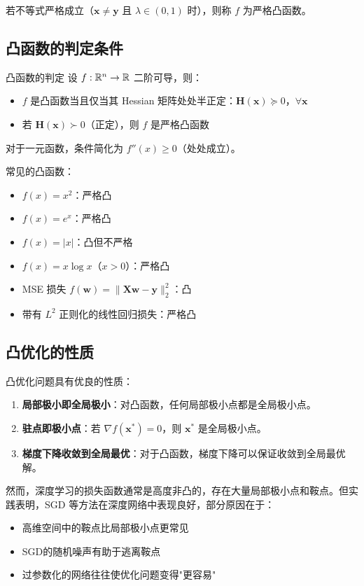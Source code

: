 若不等式严格成立（$\mathbf{x}\neq\mathbf{y}$ 且 $\lambda\in(0,1)$ 时），则称 $f$ 为严格凸函数。

\subsection{凸函数的判定条件}

\begin{myTheorem}{凸函数的判定}
设 $f:\mathbb{R}^n\to\mathbb{R}$ 二阶可导，则：
\begin{itemize}
    \item $f$ 是凸函数当且仅当其 Hessian 矩阵处处半正定：$\mathbf{H}(\mathbf{x})\succeq 0$，$\forall\mathbf{x}$
    \item 若 $\mathbf{H}(\mathbf{x})\succ 0$（正定），则 $f$ 是严格凸函数
\end{itemize}
\end{myTheorem}

对于一元函数，条件简化为 $f''(x)\geq 0$（处处成立）。

常见的凸函数：
\begin{itemize}
    \item $f(x)=x^2$：严格凸
    \item $f(x)=e^x$：严格凸
    \item $f(x)=|x|$：凸但不严格
    \item $f(x)=x\log x$（$x>0$）：严格凸
    \item MSE 损失 $f(\mathbf{w})=\|\mathbf{X}\mathbf{w}-\mathbf{y}\|_2^2$：凸
    \item 带有 $L^2$ 正则化的线性回归损失：严格凸
\end{itemize}

\subsection{凸优化的性质}

凸优化问题具有优良的性质：

\begin{enumerate}
    \item \textbf{局部极小即全局极小}：对凸函数，任何局部极小点都是全局极小点。
    \item \textbf{驻点即极小点}：若 $\nabla f(\mathbf{x}^*)=0$，则 $\mathbf{x}^*$ 是全局极小点。
    \item \textbf{梯度下降收敛到全局最优}：对于凸函数，梯度下降可以保证收敛到全局最优解。
\end{enumerate}

然而，深度学习的损失函数通常是高度非凸的，存在大量局部极小点和鞍点。但实践表明，SGD 等方法在深度网络中表现良好，部分原因在于：
\begin{itemize}
    \item 高维空间中的鞍点比局部极小点更常见
    \item SGD的随机噪声有助于逃离鞍点
    \item 过参数化的网络往往使优化问题变得"更容易"
\end{itemize}

